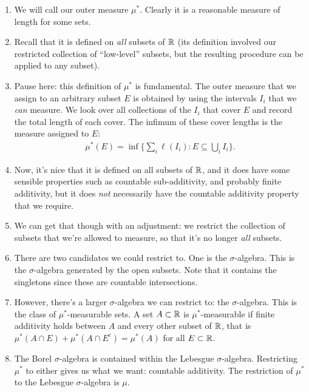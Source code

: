 \begin{enumerate}
\item We will call our outer measure $\mu^*$. Clearly it is a reasonable measure of length for some sets.

\item Recall that it is defined on {\it all} subsets of $\mathbb{R}$ (its definition involved our restricted collection of
  ``low-level​'' subsets, but the resulting procedure can be applied to any subset).

\item Pause here: this definition of $\mu^*$ is fundamental. The outer measure that we assign to an arbitrary
  subset $E$ is obtained by using the intervals $I_i$ that we {\it can} measure. We look over all collections of
  the $I_i$ that cover $E$ and record the total length of each cover. The infimum of these cover lengths is the
  measure assigned to $E$:
  \begin{align*}
    \mu^*(E) = \inf\Big\{\sum_i \ell(I_i) : E \subseteq \bigcup_i I_i\Big\}.
  \end{align*}
\item Now, it's nice that it is defined on all subsets of $\mathbb{R}$, and it does have some sensible properties such as
  countable sub-additivity, and probably finite additivity, but it does {\it not} necessarily have the countable
  additivity property that we require.

\item We can get that though with an adjustment: we restrict the collection of subsets that we're allowed to
  measure, so that it's no longer {\it all} subsets.

\item There are two candidates we could restrict to. One is the  $\sigma$-algebra. This is the
  $\sigma$-algebra generated by the open subsets. Note that it contains the singletons since these are
  countable intersections.

\item However, there's a larger $\sigma$-algebra we can restrict to: the  $\sigma$-algebra. This is the class
  of $\mu^*$-measurable sets. A set $A \subset \mathbb{R}$ is $\mu^*$-measurable if finite additivity holds between $A$
  and every other subset of $\mathbb{R}$, that is $\mu^*(A \cap E) + \mu^*(A \cap E^c) = \mu^*(A)$ for
  all $E \subset \mathbb{R}$.

\item The Borel $\sigma$-algebra is contained within the Lebesgue $\sigma$-algebra. Restricting $\mu^*$ to either
  gives us what we want: countable additivity. The restriction of $\mu^*$ to the Lebesgue $\sigma$-algebra is
   $\mu$.


\end{enumerate}
